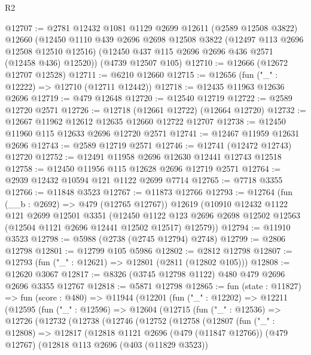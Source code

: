 \begin{lexlean}{R2}
\begin{coremodule}
@12707 := @2781
    @12432
    @1081
    @1129
    @2699
    @12611
    (@2589 @12508 @3822)
    @12660
    (@12450
      @1110
      @439
      @2696
      @2698
      @12508
      @3822
      (@12497 @113 @2696 @12508 @12510 @12516)
      (@12450 @437 @115 @2696 @2696 @436 @2571 (@12458 @436) @12520))
    (@4739 @12507 @105)
@12710 := @12666 (@12672 @12707 @12528)
@12711 := @6210 @12660
@12715 := @12656 (fun ("_" : @12222) => @12710 (@12711 @12442))
@12718 := @12435 @11963 @12636 @2696
@12719 := @479 @12648
@12720 := @12540 @12719
@12722 := @2589 @12720 @2571
@12726 := @12718 (@12661 @12722) (@12664 @12720)
@12732 := @12667 @11962 @12612 @12635 @12660 @12722 @12707
@12738 := @12450 @11960 @115 @12633 @2696 @12720 @2571
@12741 := @12467 @11959 @12631 @2696
@12743 := @2589 @12719 @2571
@12746 := @12741 (@12472 @12743) @12720
@12752 := @12491 @11958 @2696 @12630 @12441 @12743 @12518
@12758 := @12450 @11956 @115 @12628 @2696 @12719 @2571
@12764 := @2939 @12432 @10594 @121 @1122 @2699 @7714
@12765 := @7718 @3355
@12766 := @11848 @3523
@12767 := @11873 @12766
@12793 := @12764
    (fun (__b : @2692) => @479 (@12765 @12767))
    @12619
    (@10910
      @12432
      @1122
      @121
      @2699
      @12501
      @3351
      (@12450
        @1122
        @123
        @2696
        @2698
        @12502
        @12563
        (@12504 @1121 @2696 @12441 @12502 @12517)
        @12579))
@12794 := @11910 @3523
@12798 := @5988 (@2738 (@2745 @12794) @2748)
@12799 := @2806 @12798
@12801 := @12799 @105 @5986
@12802 := @2812 @12798
@12807 := @12793 (fun ("_" : @12621) => @12801 (@2811 (@12802 @105)))
@12808 := @12620 @3067
@12817 := @8326 (@3745 @12798 @1122) @480 @479 @2696 @2696 @3355 @12767
@12818 := @5871 @12798
@12865 := fun (state : @11827) =>
  fun (score : @480) =>
  @11944
    (@12201
      (fun ("_" : @12202) =>
      @12211
        (@12595
          (fun ("_" : @12596) =>
          @12604
            (@12715
              (fun ("_" : @12536) =>
              @12726
                (@12732
                  (@12738
                    (@12746
                      (@12752
                        (@12758
                          (@12807
                            (fun ("_" : @12808) =>
                            @12817
                              (@12818
                                @1121
                                @2696
                                (@479 (@11847 @12766))
                                (@479 @12767)
                                (@12818
                                  @113
                                  @2696
                                  (@403 (@11829 @3523))

\end{coremodule}
\end{lexlean}
